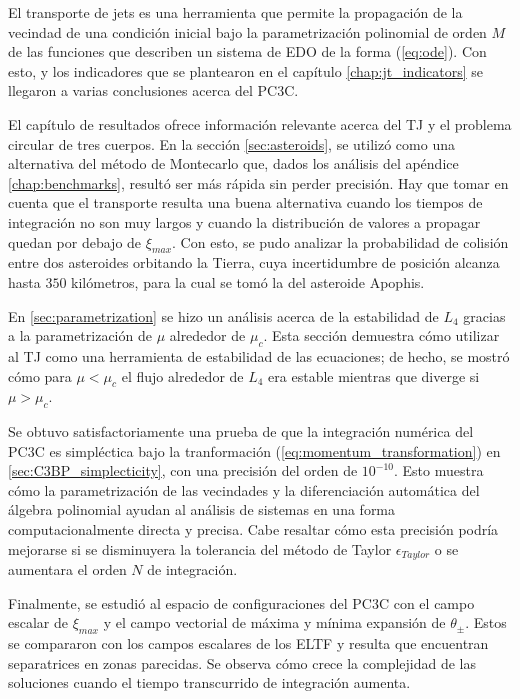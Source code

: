 El transporte de jets es una herramienta que permite la propagación de la vecindad de una condición inicial bajo la parametrización polinomial de orden $M$ de las funciones que describen un sistema de EDO de la forma (\ref{eq:ode}). Con esto, y los indicadores que se plantearon en el capítulo \ref{chap:jt_indicators} se llegaron a varias conclusiones acerca del PC3C.

El capítulo de resultados ofrece información relevante acerca del TJ y el problema circular de tres cuerpos. En la sección \ref{sec:asteroids}, se utilizó como una alternativa del método de Montecarlo que, dados los análisis del apéndice \ref{chap:benchmarks}, resultó ser más rápida sin perder precisión. Hay que tomar en cuenta que el transporte resulta una buena alternativa cuando los tiempos de integración no son muy largos y cuando la distribución de valores a propagar quedan por debajo de $\xi_{max}$. Con esto, se pudo analizar la probabilidad de colisión entre dos asteroides orbitando la Tierra, cuya incertidumbre de posición alcanza hasta $350$ kilómetros, para la cual se tomó la del asteroide Apophis. 

En \ref{sec:parametrization} se hizo un análisis acerca de la estabilidad de $L_4$ gracias a la parametrización de $\mu$ alrededor de $\mu_c$. Esta sección demuestra cómo utilizar al TJ como una herramienta de estabilidad de las ecuaciones; de hecho, se mostró cómo para $\mu < \mu_c$ el flujo alrededor de $L_4$ era estable mientras que diverge si $\mu > \mu_c$. 

Se obtuvo satisfactoriamente una prueba de que la integración numérica del PC3C es simpléctica bajo la tranformación (\ref{eq:momentum_transformation}) en \ref{sec:C3BP_simplecticity}, con una precisión del orden de $10^{-10}$. Esto muestra cómo la parametrización de las vecindades y la diferenciación automática del álgebra polinomial ayudan al análisis de sistemas en una forma computacionalmente directa y precisa. Cabe resaltar cómo esta precisión podría mejorarse si se disminuyera la tolerancia del método de Taylor $\epsilon_{Taylor}$ o se aumentara el orden $N$ de integración.

Finalmente, se estudió al espacio de configuraciones del PC3C con el campo escalar de $\xi_{max}$ y el campo vectorial de máxima y mínima expansión de $\theta_{\pm}$. Estos se compararon con los campos escalares de los ELTF y resulta que encuentran separatrices en zonas parecidas. Se observa cómo crece la complejidad de las soluciones cuando el tiempo transcurrido de integración aumenta.

